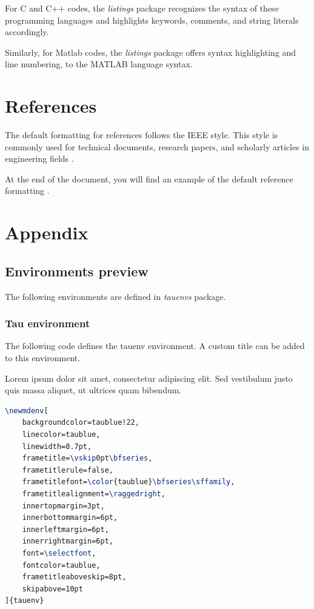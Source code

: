 \documentclass[9pt,a4paper,twoside]{tau}
\begin{document}
    For C and C++ codes, the \textit{listings} package recognizes the syntax of these programming languages and highlights keywords, comments, and string literals accordingly.

    

    Similarly, for Matlab codes, the \textit{listings} package offers syntax highlighting and line numbering, to the MATLAB language syntax.
    
    

\section{References}

    The default formatting for references follows the IEEE style. This style is commonly used for technical documents, research papers, and scholarly articles in engineering fields \cite{einstein}.

    At the end of the document, you will find an example of the default reference formatting \cite{dirac}.
        
\section{Appendix}

    \subsection{Environments preview}

        The following environments are defined in \textit{tauenvs} package.
		
		\subsubsection{Tau environment}

                The following code defines the tauenv environment. A custom title can be added to this environment.

			\begin{tauenv}[frametitle=Tauenv]
                    Lorem ipsum dolor sit amet, consectetur adipiscing elit. Sed vestibulum justo quis massa aliquet, ut ultrices quam bibendum.
			\end{tauenv}
		
\begin{lstlisting}[language=TeX, caption=Tauenv environment code.]
\newmdenv[
	backgroundcolor=taublue!22, 					
	linecolor=taublue,									
	linewidth=0.7pt,
	frametitle=\vskip0pt\bfseries,
	frametitlerule=false,
	frametitlefont=\color{taublue}\bfseries\sffamily,
	frametitlealignment=\raggedright,
	innertopmargin=3pt,
	innerbottommargin=6pt,
	innerleftmargin=6pt,
	innerrightmargin=6pt,
	font=\selectfont,
	fontcolor=taublue,									
	frametitleaboveskip=8pt,
	skipabove=10pt
]{tauenv} \end{lstlisting}
		
\end{document}
